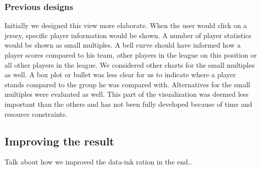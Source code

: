 \documentclass[chi_draft]{sigchi}
\begin{document}
\subsubsection{Previous designs}
Initially we designed this view more elaborate. When the user would click on a
jersey, specific player information would be shown. A number of player
statistics would be shown as small multiples. A bell curve should have informed
how a player scores compared to his team, other players in the league on this
position or all other players in the league. We considered other charts for the
small multiples as well. A box plot or bullet was less clear for us to indicate
where a player stands compared to the group he was compared with. Alternatives
for the small multiples were evaluated as well. This part of the visualization
was deemed less important than the others and has not been fully developed
because of time and resource constraints. 

\subsection{Improving the result}
Talk about how we improved the data-ink ration in the end..
\end{document}
